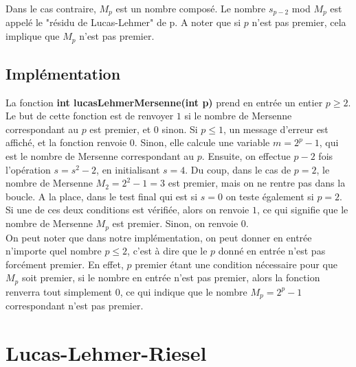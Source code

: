 \documentclass[a4paper]{article}
\begin{document}
Dans le cas contraire, $M_p$ est un nombre composé. Le nombre $s_{p-2}$
mod $M_p$ est appelé le "résidu de Lucas-Lehmer" de p. A noter que si $p$
n'est pas premier, cela implique que $M_p$ n'est pas premier.

\subsection{Implémentation}

La fonction \textbf{int lucasLehmerMersenne(int p)} prend en entrée un entier
$p \geq 2$. Le but de cette fonction est de renvoyer $1$ si le nombre de
Mersenne correspondant au $p$ est premier, et $0$ sinon. Si $p \leq 1$, un
message d'erreur est affiché, et la fonction renvoie 0. Sinon, elle calcule
une variable $m = 2^p-1$, qui est le nombre de Mersenne correspondant au $p$. 
Ensuite, on effectue $p-2$ fois l'opération $s = s^2 - 2$, en initialisant
$s = 4$. Du coup, dans le cas de $p = 2$, le nombre de Mersenne $M_2=2^2-1=3$
est premier, mais on ne rentre pas dans la boucle. A la place, dans le test
final qui est si $s=0$ on teste également si $p=2$. Si une de ces deux conditions
est vérifiée, alors on renvoie $1$, ce qui signifie que le nombre de Mersenne
$M_p$ est premier. Sinon, on renvoie $0$.\\

On peut noter que dans notre implémentation, on peut donner en entrée
n'importe quel nombre $p\leq 2$, c'est à dire que le $p$ donné en entrée
n'est pas forcément premier. En effet, $p$ premier étant une condition
nécessaire pour que $M_p$ soit premier, si le nombre en entrée n'est pas
premier, alors la fonction renverra tout simplement 0, ce qui indique que
le nombre $M_p=2^p-1$ correspondant n'est pas premier.

\newpage

\section{Lucas-Lehmer-Riesel}
\end{document}
